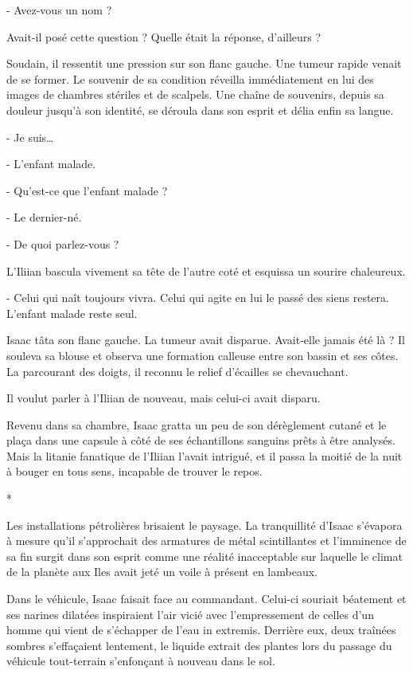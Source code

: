 \documentclass[12pt]{book}
\newcommand{\s}{\begin{center}
*
\end{center}
}
\begin{document}
  - Avez-vous un nom ?

Avait-il posé cette question ? Quelle était la réponse, d’ailleurs ?

Soudain, il ressentit une pression sur son flanc gauche. Une tumeur rapide venait de se former. Le souvenir de sa condition réveilla immédiatement en lui des images de chambres stériles et de scalpels. Une chaîne de souvenirs, depuis sa douleur jusqu’à son identité, se déroula dans son esprit et délia enfin sa langue.

   - Je suis…

   - L’enfant malade.

   - Qu’est-ce que l’enfant malade ?

    -  Le dernier-né.

    -  De quoi parlez-vous ?

L’Iliian bascula vivement sa tête de l’autre coté et esquissa un sourire chaleureux.

     - Celui qui naît toujours vivra. Celui qui agite en lui le passé des siens restera. L’enfant malade reste seul.


Isaac tâta son flanc gauche. La tumeur avait disparue. Avait-elle jamais été là ? Il souleva sa blouse et observa une formation calleuse entre son bassin et ses côtes. La parcourant des doigts, il reconnu le relief d’écailles se chevauchant.


Il voulut parler à l’Iliian de nouveau, mais celui-ci avait disparu.


Revenu dans sa chambre, Isaac gratta un peu de son dérèglement cutané et le plaça dans une capsule à côté de ses échantillons sanguins prêts à être analysés. Mais la litanie fanatique de l'Iliian l'avait intrigué, et il passa la moitié de la nuit à bouger en tous sens, incapable de trouver le repos.

\s

Les installations pétrolières brisaient le paysage. La tranquillité d’Isaac s’évapora à mesure qu’il s’approchait des armatures de métal scintillantes et l’imminence de sa fin surgit dans son esprit comme une réalité inacceptable sur laquelle le climat de la planète aux Iles avait jeté un voile à présent en lambeaux.


Dans le véhicule, Isaac faisait face au commandant. Celui-ci souriait béatement et ses narines dilatées inspiraient l’air vicié avec l’empressement de celles d’un homme qui vient de s’échapper de l’eau in extremis. Derrière eux, deux traînées sombres s’effaçaient lentement, le liquide extrait des plantes lors du passage du véhicule tout-terrain s’enfonçant à nouveau dans le sol.
\end{document}
